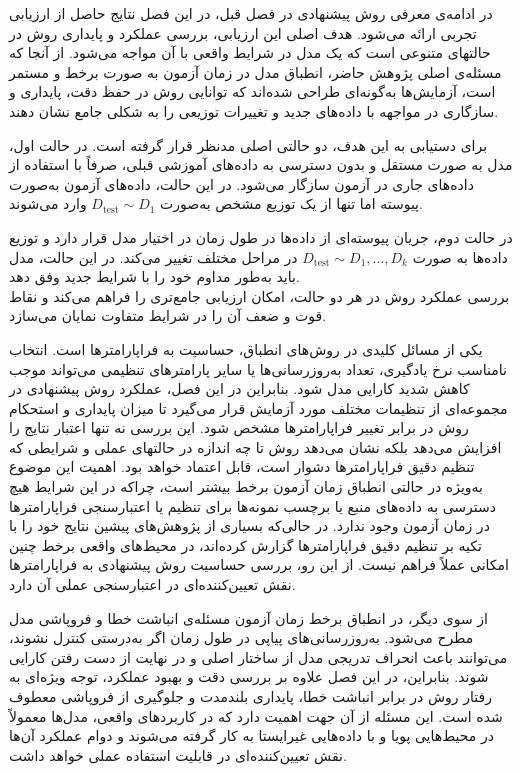 
در ادامه‌ی معرفی روش پیشنهادی در فصل قبل، در این فصل نتایج حاصل از ارزیابی تجربی ارائه می‌شود. هدف اصلی این ارزیابی، بررسی عملکرد و پایداری روش در حالتهای متنوعی است که یک مدل در شرایط واقعی با آن مواجه می‌شود. از آنجا که مسئله‌ی اصلی پژوهش حاضر، انطباق مدل در زمان آزمون به صورت برخط و مستمر است، آزمایش‌ها به‌گونه‌ای طراحی شده‌اند که توانایی روش در حفظ دقت، پایداری و سازگاری در مواجهه با داده‌های جدید و تغییرات توزیعی را به شکلی جامع نشان دهند.  

برای دستیابی به این هدف، دو حالتی اصلی مدنظر قرار گرفته است. در حالت اول، مدل به صورت مستقل و بدون دسترسی به داده‌های آموزشی قبلی، صرفاً با استفاده از داده‌های جاری در آزمون سازگار می‌شود. در این حالت، داده‌های آزمون به‌صورت پیوسته اما تنها از یک توزیع مشخص به‌صورت $D_{\text{test}} \sim D_1$ وارد می‌شوند.

در حالت دوم، جریان پیوسته‌ای از داده‌ها در طول زمان در اختیار مدل قرار دارد و توزیع داده‌ها به صورت $D_{\text{test}} \sim D_1, \ldots, D_k$ در مراحل مختلف تغییر می‌کند. در این حالت، مدل باید به‌طور مداوم خود را با شرایط جدید وفق دهد.\\
بررسی عملکرد روش در هر دو حالت، امکان ارزیابی جامع‌تری را فراهم می‌کند و نقاط قوت و ضعف آن را در شرایط متفاوت نمایان می‌سازد.  

یکی از مسائل کلیدی در روش‌های انطباق، حساسیت به فراپارامترها است. انتخاب نامناسب نرخ یادگیری، تعداد به‌روزرسانی‌ها یا سایر پارامترهای تنظیمی می‌تواند موجب کاهش شدید کارایی مدل شود. بنابراین در این فصل، عملکرد روش پیشنهادی در مجموعه‌ای از تنظیمات مختلف مورد آزمایش قرار می‌گیرد تا میزان پایداری و استحکام روش در برابر تغییر فراپارامترها مشخص شود. این بررسی نه تنها اعتبار نتایج را افزایش می‌دهد بلکه نشان می‌دهد روش تا چه اندازه در حالتهای عملی و شرایطی که تنظیم دقیق فراپارامترها دشوار است، قابل اعتماد خواهد بود. اهمیت این موضوع به‌ویژه در حالتی انطباق زمان آزمون برخط بیشتر است، چراکه در این شرایط هیچ دسترسی به داده‌های منبع یا برچسب نمونه‌ها برای تنظیم یا اعتبارسنجی فراپارامترها در زمان آزمون وجود ندارد. در حالی‌که بسیاری از پژوهش‌های پیشین نتایج خود را با تکیه بر تنظیم دقیق فراپارامترها گزارش کرده‌اند، در محیط‌های واقعی برخط چنین امکانی عملاً فراهم نیست. از این رو، بررسی حساسیت روش پیشنهادی به فراپارامترها نقش تعیین‌کننده‌ای در اعتبارسنجی عملی آن دارد.  

از سوی دیگر، در انطباق برخط زمان آزمون مسئله‌ی انباشت خطا و فروپاشی مدل مطرح می‌شود. به‌روزرسانی‌های پیاپی در طول زمان اگر به‌درستی کنترل نشوند، می‌توانند باعث انحراف تدریجی مدل از ساختار اصلی و در نهایت از دست رفتن کارایی شوند. بنابراین، در این فصل علاوه بر بررسی دقت و بهبود عملکرد، توجه ویژه‌ای به رفتار روش در برابر انباشت خطا، پایداری بلندمدت و جلوگیری از فروپاشی معطوف شده است. این مسئله از آن جهت اهمیت دارد که در کاربردهای واقعی، مدل‌ها معمولاً در محیط‌هایی پویا و با داده‌هایی غیرایستا به کار گرفته می‌شوند و دوام عملکرد آن‌ها نقش تعیین‌کننده‌ای در قابلیت استفاده عملی خواهد داشت.  

